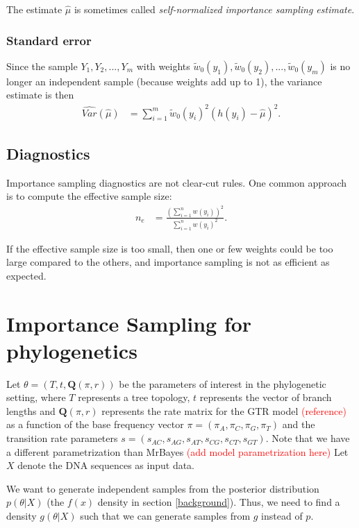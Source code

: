 \documentclass[conference]{IEEEtran}
\newcommand{\falta}[1]{\textcolor{red}{#1}}
\begin{document}
The estimate $\hat{\mu}$ is sometimes called
\textit{self-normalized importance sampling estimate}.

\subsubsection*{Standard error}
Since the sample $Y_1,Y_2,...,Y_m$ with weights
$\tilde{w}_0(y_1),\tilde{w}_0(y_2),...,\tilde{w}_0(y_m)$ is no longer
an independent sample (because weights add up to 1), the variance
estimate is then \citep{Owen2013}
\begin{align*}
\widehat{Var}(\hat{\mu}) &= \sum_{i=1}^m \tilde{w}_0(y_i)^2(h(y_i)-\hat{\mu})^2.
\end{align*}

\subsection*{Diagnostics}
Importance sampling diagnostics are not clear-cut rules. One common
approach is to compute the effective sample size:
\begin{align*}
n_e &= \frac{\left( \sum_{i=1}^n w(y_i) \right)^2}{\sum_{i=1}^nw(y_i)^2}.
\end{align*}

If the effective sample size is too small, then one or few weights
could be too large compared to the others, and importance sampling is
not as efficient as expected.

\section{Importance Sampling for phylogenetics}
\label{phyloIS}

Let $\theta = (T, t, \mathbf{Q}(\pi,r))$ be the parameters of interest
in the phylogenetic setting, where $T$ represents a tree topology,
$t$ represents the vector of branch lengths and $\mathbf{Q}(\pi,r)$
represents the rate matrix for the GTR model \falta{(reference)} as a
function of the base frequency vector $\pi = (\pi_A, \pi_C, \pi_G,
\pi_T)$ and the transition rate parameters $s = (s_{AC}, s_{AG},
s_{AT}, s_{CG}, s_{CT}, s_{GT})$. Note that we have a different
parametrization than MrBayes \falta{(add model parametrization here)}
Let $X$ denote the DNA sequences as input data.

We want to generate independent samples from the posterior
distribution $p(\theta|X)$ (the $f(x)$ density in section
\ref{background}). Thus, we need to find a density $g(\theta|X)$ such
that we can generate samples from $g$ instead of $p$. 
\end{document}
